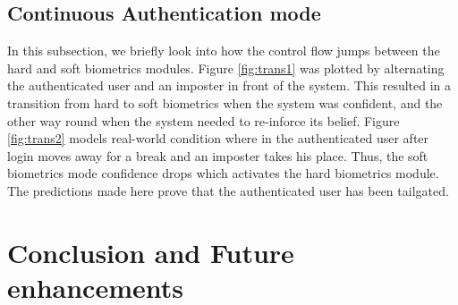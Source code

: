 \documentclass[%
        final,
        notitlepage,
        narroweqnarray,
        inline,
        ]{ieee}
\begin{document}
\subsection{Continuous Authentication mode}
\begin{figure}
	\centering
	\quad
\end{figure}
In this subsection, we briefly look into how the control flow jumps between the hard and soft biometrics modules.
Figure \ref{fig:trans1} was plotted by alternating the authenticated user and an imposter in front of the system.
This resulted in a transition from hard to soft biometrics when the system was confident, and the other way round when the system needed to re-inforce its belief.
Figure \ref{fig:trans2} models real-world condition where in the authenticated user after login moves away for a break and an imposter takes his place.
Thus, the soft biometrics mode confidence drops which activates the hard biometrics module.
The predictions made here prove that the authenticated user has been tailgated.

\section{Conclusion and Future enhancements}



\end{document}
